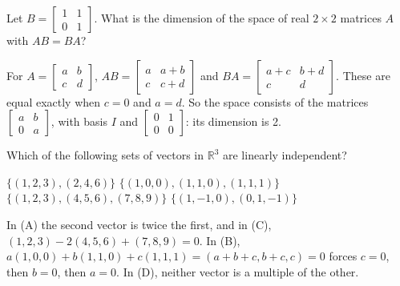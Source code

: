 \begin{question}[id=basis-9, marks=2]
Let $B = \begin{bmatrix} 1 & 1 \\ 0 & 1 \end{bmatrix}$. What is the dimension of the space of real $2 \times 2$ matrices $A$ with $AB = BA$?
\begin{solution}
For $A = \begin{bmatrix} a & b \\ c & d \end{bmatrix}$, $AB = \begin{bmatrix} a & a + b \\ c & c + d \end{bmatrix}$ and $BA = \begin{bmatrix} a + c & b + d \\ c & d \end{bmatrix}$. These are equal exactly when $c = 0$ and $a = d$. So the space consists of the matrices $\begin{bmatrix} a & b \\ 0 & a \end{bmatrix}$, with basis $I$ and $\begin{bmatrix} 0 & 1 \\ 0 & 0 \end{bmatrix}$: its dimension is 2.
\end{solution}
\end{question}

\begin{question}[id=basis-10, type=msq, marks=2]
Which of the following sets of vectors in $\mathbb{R}^3$ are linearly independent?
\begin{options}
  \option $\{(1, 2, 3), (2, 4, 6)\}$
  \correct $\{(1, 0, 0), (1, 1, 0), (1, 1, 1)\}$
  \option $\{(1, 2, 3), (4, 5, 6), (7, 8, 9)\}$
  \correct $\{(1, -1, 0), (0, 1, -1)\}$
\end{options}
\begin{solution}
In (A) the second vector is twice the first, and in (C), $(1, 2, 3) - 2(4, 5, 6) + (7, 8, 9) = 0$. In (B), $a(1, 0, 0) + b(1, 1, 0) + c(1, 1, 1) = (a + b + c, b + c, c) = 0$ forces $c = 0$, then $b = 0$, then $a = 0$. In (D), neither vector is a multiple of the other.
\end{solution}
\end{question}

